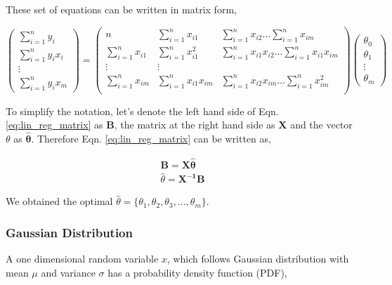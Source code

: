 \documentclass[english]{tktltiki}
\begin{document}
These set of equations can be written in matrix form,

$$
\begin{pmatrix}
\sum_{i=1}^n y_i \\
\sum_{i=1}^n y_i x_i \\
\vdots \\
\sum_{i=1}^n y_i x_m
\end{pmatrix}
=%
\begin{pmatrix}
n & \sum_{i=1}^n x_{i1} & \sum_{i=1}^n x_{i2} \hdots \sum_{i=1}^n x_{im} \\
\sum_{i=1}^n x_{i1} & \sum_{i=1}^n x_{i1}^2 & \sum_{i=1}^n x_{i1} x_{i2} \hdots \sum_{i=1}^n x_{i1} x_{im} \\
\vdots&\vdots \\
\sum_{i=1}^n x_{im} & \sum_{i=1}^n x_{i1} x_{im} & \sum_{i=1}^n x_{i2} x_{im} \hdots \sum_{i=1}^n x_{im}^2 \\
\end{pmatrix}
%
\begin{pmatrix}
\theta_0 \\
\theta_1 \\
\vdots \\
\theta_m
\end{pmatrix}
\label{eq:lin_reg_matrix}
$$

To simplify the notation, let's denote the left hand side of Eqn. \ref{eq:lin_reg_matrix} as $\mathbf{B}$, the matrix at the right hand side as $\mathbf{X}$ and the vector $\theta$ as $\hat{\mathbf{\theta}}$. Therefore Eqn. \ref{eq:lin_reg_matrix} can be written as,

\begin{eqnarray}
\mathbf{B} = \mathbf{X \hat{\theta}} \nonumber \\
\hat{\theta} = \mathbf{X^{-1}} \mathbf{B}
\label{reg_param}
\end{eqnarray}

We obtained the optimal $\hat{\theta} = \{\theta_1, \theta_2, \theta_3, ...,\theta_m\}$.

\subsubsection{Gaussian Distribution}

A one dimensional random variable $x$, which follows Gaussian distribution with mean $\mu$ and variance $\sigma$ has a probability density function (PDF),
\end{document}

